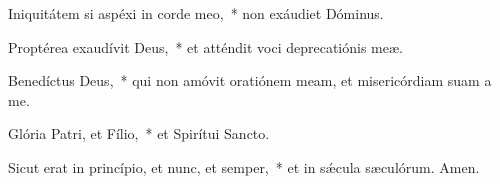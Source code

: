\item Iniquitátem si aspéxi in corde meo,~* non exáudiet Dóminus.

\item Proptérea exaudívit Deus,~* et atténdit voci deprecatiónis meæ.

\item Benedíctus Deus,~* qui non amóvit oratiónem meam, et misericórdiam suam a me.

\item Glória Patri, et Fílio,~* et Spirítui Sancto.

\item Sicut erat in princípio, et nunc, et semper,~* et in sǽcula sæculórum. Amen.

